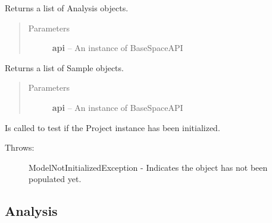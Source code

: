 \documentclass[letterpaper,10pt,english]{sphinxmanual}
\begin{document}
\begin{fulllineitems}
\begin{fulllineitems}
\label{Available modules:BaseSpacePy.model.Project.Project.getAnalyses}
Returns a list of Analysis objects.
\begin{quote}\begin{description}
\item[{Parameters}] \leavevmode
\textbf{api} -- An instance of BaseSpaceAPI

\end{description}\end{quote}

\end{fulllineitems}


\begin{fulllineitems}
\label{Available modules:BaseSpacePy.model.Project.Project.getSamples}
Returns a list of Sample objects.
\begin{quote}\begin{description}
\item[{Parameters}] \leavevmode
\textbf{api} -- An instance of BaseSpaceAPI

\end{description}\end{quote}

\end{fulllineitems}


\begin{fulllineitems}
\label{Available modules:BaseSpacePy.model.Project.Project.isInit}
Is called to test if the Project instance has been initialized.
\begin{description}
\item[{Throws:}] \leavevmode
ModelNotInitializedException - Indicates the object has not been populated yet.

\end{description}

\end{fulllineitems}


\end{fulllineitems}



\subsection{Analysis}
\label{Available modules:analysis}
\end{document}
